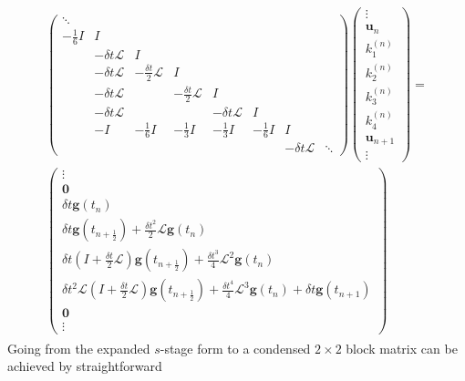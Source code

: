 \documentclass[a4paper,12pt]{article}
\begin{document}
{\footnotesize
\begin{align}
\begin{split}
\begin{pmatrix}
\ddots \\ 
-\tfrac{1}{6}I &I &  &  &  &   & \\
&-\delta t \mathcal{L} & I &  &  &  &  \\
&-\delta t \mathcal{L} & -\tfrac{\delta t}{2} \mathcal{L} & I &   &  & \\
&-\delta t \mathcal{L} &  & -\tfrac{\delta t}{2} \mathcal{L} & I  &  & \\
&-\delta t \mathcal{L} &  &  & -\delta t \mathcal{L} & I &  \\
&-I & -\frac{1}{6}I & -\frac{1}{3}I & -\frac{1}{3}I & -\frac{1}{6}I & I \\
&&&&&& -\delta t \mathcal{L} & \ddots
\end{pmatrix}
\begin{pmatrix} \vdots \\ \mathbf{u}_n \\ k_1^{(n)} \\ k_2^{(n)} \\ k_3^{(n)} \\ k_4^{(n)} \\ \mathbf{u}_{n+1}  \\ \vdots \end{pmatrix}
= \\
\begin{pmatrix} \vdots \\ \mathbf{0} \\ \delta t\mathbf{g}(t_n) \\  \delta t\mathbf{g}(t_{n+\frac{1}{2}}) +
	\tfrac{\delta t^2}{2}\mathcal{L}\mathbf{g}(t_n) \\ \delta t(I+\tfrac{\delta t}{2}\mathcal{L})\mathbf{g}(t_{n+\frac{1}{2}}) +
	\tfrac{\delta t^3}{4}\mathcal{L}^2\mathbf{g}(t_n) \\ \delta t^2\mathcal{L}(I+\tfrac{\delta t}{2}\mathcal{L})\mathbf{g}(t_{n+\frac{1}{2}}) +
	\tfrac{\delta t^4}{4}\mathcal{L}^3\mathbf{g}(t_n) + \delta t \mathbf{g}(t_{n+1}) \\ \mathbf{0}  \\ \vdots
\end{pmatrix}
\end{split}\label{eq:s_stage}
\end{align}
%
}Going from the expanded $s$-stage form to a condensed $2\times 2$ block matrix can be achieved by straightforward
\end{document}

